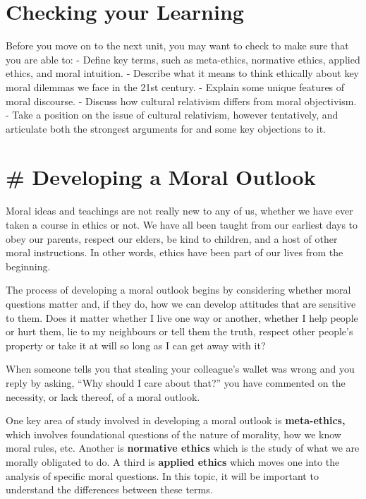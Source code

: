 \documentclass[
]{book}
\begin{document}
\hypertarget{checking-your-learning}{%
\section{Checking your Learning}\label{checking-your-learning}}

Before you move on to the next unit, you may want to check to make sure that you are able to:
- Define key terms, such as meta-ethics, normative ethics, applied ethics, and moral intuition.
- Describe what it means to think ethically about key moral dilemmas we face in the 21st century.
- Explain some unique features of moral discourse.
- Discuss how cultural relativism differs from moral objectivism.
- Take a position on the issue of cultural relativism, however tentatively, and articulate both the strongest arguments for and some key objections to it.

\hypertarget{developing-a-moral-outlook}{%
\section{\# Developing a Moral Outlook}\label{developing-a-moral-outlook}}

Moral ideas and teachings are not really new to any of us, whether we have ever taken a course in ethics or not. We have all been taught from our earliest days to obey our parents, respect our elders, be kind to children, and a host of other moral instructions. In other words, ethics have been part of our lives from the beginning.

The process of developing a moral outlook begins by considering whether moral questions matter and, if they do, how we can develop attitudes that are sensitive to them. Does it matter whether I live one way or another, whether I help people or hurt them, lie to my neighbours or tell them the truth, respect other people's property or take it at will so long as I can get away with it?

When someone tells you that stealing your colleague's wallet was wrong and you reply by asking, ``Why should I care about that?'' you have commented on the necessity, or lack thereof, of a moral outlook.

One key area of study involved in developing a moral outlook is \textbf{meta-ethics,} which involves foundational questions of the nature of morality, how we know moral rules, etc. Another is \textbf{normative ethics} which is the study of what we are morally obligated to do. A third is \textbf{applied ethics} which moves one into the analysis of specific moral questions. In this topic, it will be important to understand the differences between these terms.
\end{document}
